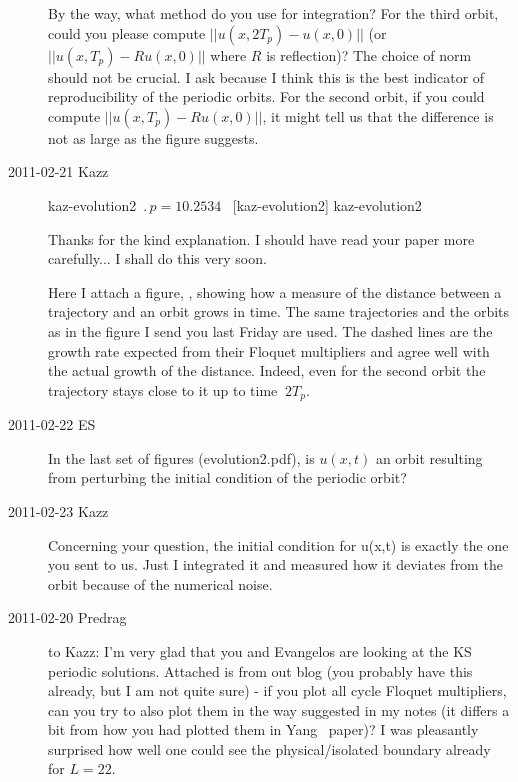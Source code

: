 \begin{description}
By the way, what method do you use for integration? For the third
orbit, could you please compute $||u(x,2T_p)-u(x,0)||$ (or
$||u(x,T_p)-Ru(x,0)||$ where $R$ is reflection)? The choice of norm should
not be crucial. I ask because I think this is the best indicator of
reproducibility of the periodic orbits. For the second orbit, if you
could compute $||u(x,T_p)-Ru(x,0)||$, it might tell us that the
difference is not as large as the figure suggests.

\item[2011-02-21 Kazz]

{kaz-evolution2}   %
{}   %
{    %
$\period{p}=10.2534$ \po\ [kaz-evolution2]
}
{kaz-evolution2}   %


Thanks for the kind explanation. I should have read your
paper more carefully... I shall do this very soon.

Here I attach a figure, , showing
how a measure of the distance between a
trajectory and an orbit grows in time. The same trajectories and the orbits
as in the figure I send you last Friday are used. The dashed lines are the
growth rate expected from their Floquet multipliers and agree well with the
actual growth of the distance. Indeed, even for the second orbit the trajectory
stays close to it up to time $~2T_p$.

\item[2011-02-22 ES] In the last set of figures (evolution2.pdf), is $u(x,t)$
an orbit resulting from perturbing the initial condition of the periodic orbit?

\item[2011-02-23 Kazz] Concerning your question, the initial condition for u(x,t)
is exactly the one you sent to us. Just I integrated it and measured how
it deviates from the orbit because of the numerical noise.


\item[2011-02-20 Predrag] to Kazz:
I'm very glad that you and Evangelos are looking at the KS periodic solutions.
Attached is  from out blog
(you probably have this already, but
I am not quite sure) - if you plot all cycle Floquet multipliers, can you try to
also plot them in the way suggested in my notes (it differs a bit from how you
had plotted them in Yang \etal\ paper)?
I was pleasantly surprised how well one
could see the physical/isolated boundary already for $L=22$.



\end{description}
